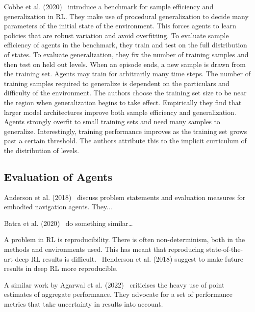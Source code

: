 Cobbe et al. (2020)~\cite{cobbe_procgen_2020} introduce a benchmark for sample efficiency and generalization in RL.
They make use of procedural generalization to decide many parameters of the initial state of the environment.
This forces agents to learn policies that are robust variation and avoid overfitting.
To evaluate sample efficiency of agents in the benchmark, they train and test on the full distribution of states.
To evaluate generalization, they fix the number of training samples and then test on held out levels.
When an episode ends, a new sample is drawn from the training set.
Agents may train for arbitrarily many time steps.
The number of training samples required to generalize is dependent on the particulars and difficulty of the environment.
The authors choose the training set size to be near the region when generalization begins to take effect.
Empirically they find that larger model architectures improve both sample efficiency and generalization.
Agents strongly overfit to small training sets and need many samples to generalize.
Interestingly, training performance improves as the training set grows past a certain threshold.
The authors attribute this to the implicit curriculum of the distribution of levels.

\subsection{Evaluation of Agents}

Anderson et al. (2018)~\cite{anderson_evaluation_2018} discuss problem statements and evaluation measures for embodied navigation agents.
They...

Batra et al. (2020)~\cite{batra_evaluation_2020} do something similar\dots

A problem in RL is reproducibility.
There is often non-determinism, both in the methods and environments used.
This has meant that reproducing state-of-the-art deep RL results is difficult.~\cite{henderson_matters_2018}
Henderson et al. (2018) suggest to make future results in deep RL more reproducible.

A similar work by Agarwal et al. (2022)~\cite{agarwal_rlliable_2022} criticises the heavy use of point estimates of aggregate performance.
They advocate for a set of performance metrics that take uncertainty in results into account. 